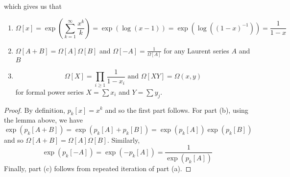 \documentclass[11pt,leqno,oneside]{amsart}
\numberwithin{thm}{section}
\begin{document}
which gives us that
\begin{prop}
  \begin{enumerate}
  \item \[
  \Omega[x] = \exp\left( \sum_{k=1}^\infty \frac{x^k}{k} \right) =
  \exp\left( \log(x-1) \right) = \exp\left( \log((1-x)^{-1}) \right) = \frac{1}{1-x}
\]
  \item \(\Omega[A+B] = \Omega[A]\Omega[B]\) and \(\Omega[-A] =
    \frac{1}{\Omega[A]}\) for any Laurent series \(A\) and \(B\)
  \item \[
  \Omega[X] = \prod_{i \geq 1} \frac{1}{1-x_i} \text{ and } \Omega[XY]
  = \Omega(x,y)
\]
for formal power series \(X = \sum x_i\) and \(Y = \sum y_j\). 
  \end{enumerate}
\end{prop}
\begin{proof}
  By definition, \(p_k[x] = x^k\) and so the first part follows. For
  part (b), using the lemma above, we have \[
    \exp\left( p_k[A+B] \right) = \exp\left(
      p_k[A]+p_k[B] \right) = \exp\left(p_k[A]
    \right)\exp \left(p_k[B] \right) 
  \]
  and so \(\Omega[A+B] = \Omega[A]\Omega[B]\). Similarly, \[
    \exp\left( p_k[-A] \right) = \exp\left( -p_k[A] \right) =
    \frac{1}{\exp\left( p_k[A] \right)} 
  \]
  Finally, part (c) follows from repeated iteration of part (a).
\end{proof}
  
\end{document}
